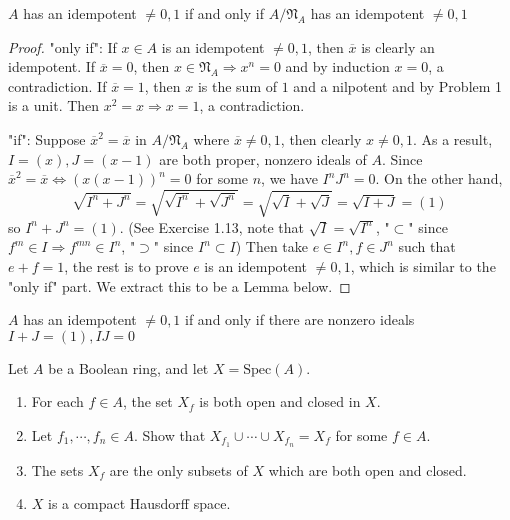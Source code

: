 \documentclass{solution}
\begin{document}
\begin{lemma}
    $A$ has an idempotent $\ne 0, 1$ if and only if $A / \mathfrak{N}_A$ has an idempotent $\ne 0, 1$
\end{lemma}

\begin{proof}
    "only if": If $x \in A$ is an idempotent $\ne 0, 1$, then $\overline{x}$ is clearly an idempotent. If $\overline{x} = 0$, then $x \in \mathfrak{N}_A \Rightarrow x^n = 0$ and by induction $x = 0$, a contradiction. If $\overline{x} = 1$, then $x$ is the sum of $1$ and a nilpotent and by Problem 1 is a unit. Then $x^2 = x \Rightarrow x = 1$, a contradiction.

    "if": Suppose $\overline{x}^2 = \overline{x}$ in $A / \mathfrak{N}_A$ where $\overline{x} \ne 0, 1$, then clearly $x \ne 0, 1$. As a result, $I = (x), J = (x - 1)$ are both proper, nonzero ideals of $A$. Since $\overline{x}^2 = \overline{x} \Leftrightarrow ( x(x - 1) )^n = 0$ for some $n$, we have $I^nJ^n = 0$. On the other hand, 
    $$\sqrt{I^n + J^n} = \sqrt{\sqrt{I^n} + \sqrt{J^n}} = \sqrt{\sqrt{I} + \sqrt{J}} = \sqrt{I + J} = (1)$$
    so $I^n + J^n = (1)$. (See Exercise 1.13, note that $\sqrt{I} = \sqrt{I^n}$, "$\subset$" since $f^m \in I \Rightarrow f^{mn} \in I^n$, "$\supset$" since $I^n \subset I$) Then take $e \in I^n, f \in J^n$ such that $e + f = 1$, the rest is to prove $e$ is an idempotent $\ne 0, 1$, which is similar to the "only if" part. We extract this to be a Lemma below.
\end{proof}

\begin{lemma}
    $A$ has an idempotent $\ne 0, 1$ if and only if there are nonzero ideals $I + J = (1), IJ = 0$
\end{lemma}

\begin{problem}
    Let $A$ be a Boolean ring, and let $X = \mathrm{Spec}(A)$.
    \begin{enumerate}
        \item For each $f \in A$, the set $X_f$ is both open and closed in $X$.
        \item Let $f_1, \cdots, f_n \in A$. Show that $X_{f_1} \cup \cdots \cup X_{f_n} = X_f$ for some $f \in A$.
        \item The sets $X_f$ are the only subsets of $X$ which are both open and closed.
        \item $X$ is a compact Hausdorff space.
    \end{enumerate}
\end{problem}
\end{document}
